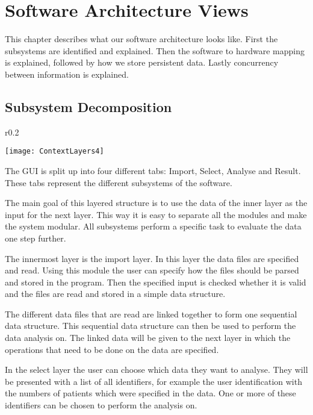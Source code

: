 \documentclass[a4paper,english,fleqn]{exam}
\begin{document}
\newpage

\section{Software Architecture Views}
This chapter describes what our software architecture looks like. First the subsystems are identified and explained. Then the software to hardware mapping is explained, followed by how we store persistent data. Lastly concurrency between information is explained.

\subsection{Subsystem Decomposition}

\begin{wrapfigure}{r}{0.2\textwidth}
  \begin{center}
    \texttt{[image: ContextLayers4]}
  \end{center}
\end{wrapfigure}

The GUI is split up into four different tabs: Import, Select, Analyse and Result. These tabs represent the different subsystems of the software.

The main goal of this layered structure is to use the data of the inner layer as the input for the next layer. This way it is easy to separate all the modules and make the system modular. All subsystems perform a specific task to evaluate the data one step further.
 
The innermost layer is the import layer. In this layer the data files are specified and read. Using this module the user can specify how the files should be parsed and stored in the program. Then the specified input is checked whether it is valid and the files are read and stored in a simple data structure.
 
The different data files that are read are linked together to form one sequential data structure. This sequential data structure can then be used to perform the data analysis on. The linked data will be given to the next layer in which the operations that need to be done on the data are specified.
 
In the select layer the user can choose which data they want to analyse. They will be presented with a list of all identifiers, for example the user identification with the numbers of patients which were specified in the data. One or more of these identifiers can be chosen to perform the analysis on.
 
\end{document}
